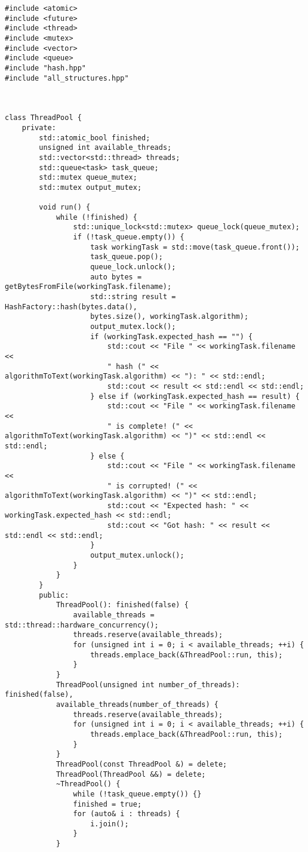 \documentclass[a4paper, 12pt]{article}
\begin{document}
\fontsize{9}{9}\selectfont
\begin{verbatim}
#include <atomic>
#include <future>
#include <thread>
#include <mutex>
#include <vector>
#include <queue>
#include "hash.hpp"
#include "all_structures.hpp"



class ThreadPool {
    private:
        std::atomic_bool finished;
        unsigned int available_threads;
        std::vector<std::thread> threads;
        std::queue<task> task_queue;
        std::mutex queue_mutex;
        std::mutex output_mutex;

        void run() {
            while (!finished) {
                std::unique_lock<std::mutex> queue_lock(queue_mutex);
                if (!task_queue.empty()) {
                    task workingTask = std::move(task_queue.front());
                    task_queue.pop();
                    queue_lock.unlock();
                    auto bytes = getBytesFromFile(workingTask.filename);
                    std::string result = HashFactory::hash(bytes.data(), 
                    bytes.size(), workingTask.algorithm);
                    output_mutex.lock();
                    if (workingTask.expected_hash == "") {
                        std::cout << "File " << workingTask.filename << 
                        " hash (" << algorithmToText(workingTask.algorithm) << "): " << std::endl;
                        std::cout << result << std::endl << std::endl;
                    } else if (workingTask.expected_hash == result) {
                        std::cout << "File " << workingTask.filename << 
                        " is complete! (" << algorithmToText(workingTask.algorithm) << ")" << std::endl << std::endl;
                    } else {
                        std::cout << "File " << workingTask.filename << 
                        " is corrupted! (" << algorithmToText(workingTask.algorithm) << ")" << std::endl;
                        std::cout << "Expected hash: " << workingTask.expected_hash << std::endl;
                        std::cout << "Got hash: " << result << std::endl << std::endl;
                    }
                    output_mutex.unlock();
                }
            }
        }
        public:
            ThreadPool(): finished(false) {
                available_threads = std::thread::hardware_concurrency();
                threads.reserve(available_threads);
                for (unsigned int i = 0; i < available_threads; ++i) {
                    threads.emplace_back(&ThreadPool::run, this);
                }
            }
            ThreadPool(unsigned int number_of_threads): finished(false), 
            available_threads(number_of_threads) {
                threads.reserve(available_threads);
                for (unsigned int i = 0; i < available_threads; ++i) {
                    threads.emplace_back(&ThreadPool::run, this);
                }
            }
            ThreadPool(const ThreadPool &) = delete;
            ThreadPool(ThreadPool &&) = delete;
            ~ThreadPool() {
                while (!task_queue.empty()) {}
                finished = true;
                for (auto& i : threads) {
                    i.join();
                }
            }


\end{verbatim}
\end{document}
